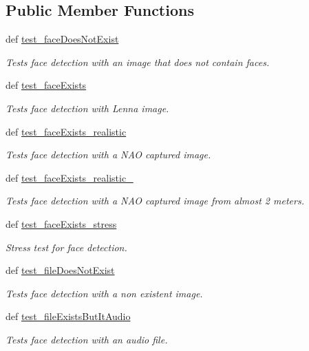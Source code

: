 \subsection*{Public Member Functions}
\begin{DoxyCompactItemize}
\item 
def \hyperlink{classfunctional__tests_1_1FaceDetFunc_ad00297274fd209b5417544feca4e2202}{test\-\_\-face\-Does\-Not\-Exist}
\begin{DoxyCompactList}\small\item\em Tests face detection with an image that does not contain faces. \end{DoxyCompactList}\item 
def \hyperlink{classfunctional__tests_1_1FaceDetFunc_acf87b7486a14e8cb90711b205ed59fdc}{test\-\_\-face\-Exists}
\begin{DoxyCompactList}\small\item\em Tests face detection with Lenna image. \end{DoxyCompactList}\item 
def \hyperlink{classfunctional__tests_1_1FaceDetFunc_a172b3f268ec490f02df4af12f14fc245}{test\-\_\-face\-Exists\-\_\-realistic}
\begin{DoxyCompactList}\small\item\em Tests face detection with a N\-A\-O captured image. \end{DoxyCompactList}\item 
def \hyperlink{classfunctional__tests_1_1FaceDetFunc_ac4f8c1308171f3b2e2ee364a125d688f}{test\-\_\-face\-Exists\-\_\-realistic\-\_}
\begin{DoxyCompactList}\small\item\em Tests face detection with a N\-A\-O captured image from almost 2 meters. \end{DoxyCompactList}\item 
def \hyperlink{classfunctional__tests_1_1FaceDetFunc_a07f7b9fb313461bbe4dd8625c44797b3}{test\-\_\-face\-Exists\-\_\-stress}
\begin{DoxyCompactList}\small\item\em Stress test for face detection. \end{DoxyCompactList}\item 
def \hyperlink{classfunctional__tests_1_1FaceDetFunc_aa2d6f937de6906d2fc09fc1ecdc0dba7}{test\-\_\-file\-Does\-Not\-Exist}
\begin{DoxyCompactList}\small\item\em Tests face detection with a non existent image. \end{DoxyCompactList}\item 
def \hyperlink{classfunctional__tests_1_1FaceDetFunc_a3a2cb0be8ac38266ce81356ac3212e00}{test\-\_\-file\-Exists\-But\-It\-Audio}
\begin{DoxyCompactList}\small\item\em Tests face detection with an audio file. \end{DoxyCompactList}\end{DoxyCompactItemize}


